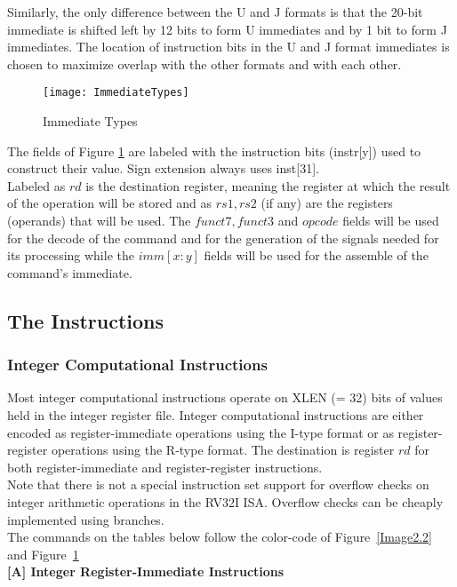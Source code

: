 	Similarly, the only difference between the U and J formats is that the 20-bit immediate is shifted left by 12 bits to form U immediates and by 1 bit to form J immediates. The location of instruction bits in the U and J format immediates is chosen to maximize overlap with the other formats and with each other.\\
	
	\begin{figure}[h!]
		
		\begin{center}
			\texttt{[image: ImmediateTypes]}
			\caption{Immediate Types}
			\label{Image2.3}
		\end{center}
	\end{figure}

	The fields of Figure \ref{Image2.3} are labeled with the instruction bits (instr[y]) used to construct their value. Sign extension always uses inst[31]. \\
	
	Labeled as $rd$ is the destination register, meaning the register at which the result of the operation will be stored and as $rs1,rs2$ (if any) are the registers (operands) that will be used. The $funct7,funct3$ and $opcode$ fields will be used for the decode of the command and for the generation of the signals needed for its processing while the $imm[x:y]$ fields will be used for the assemble of the command's immediate.	
	\newpage
	\subsection{The Instructions}
	\label{subsec:ActualInstructions}
	\subsubsection{Integer Computational Instructions}
	\label{subsubsec:IntegerInstr}
	Most integer computational instructions operate on XLEN (= 32) bits of values held in the integer register file. Integer computational instructions are either encoded as register-immediate operations using the I-type format or as register-register operations using the R-type format. The destination is register $rd$ for both register-immediate and register-register instructions. \\
	Note that there is not a special instruction set support for overflow checks on integer arithmetic operations in the RV32I ISA. Overflow checks can be cheaply implemented using branches. \\
	The commands on the tables below follow the color-code of  Figure~\ref{Image2.2} and Figure~\ref{Image2.3} \\
	\vspace{4mm}
	\textbf{ {\footnotesize[A] Integer Register-Immediate Instructions }} \\
	
